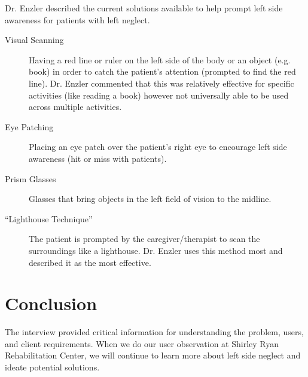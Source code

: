 Dr. Enzler described the current solutions available to help prompt left side
awareness for patients with left neglect. 
\begin{description}
\item[Visual Scanning] Having a red line or ruler on the left side of the body
  or an object (e.g. book) in order to catch the patient's attention (prompted
  to find the red line). Dr. Enzler commented that this was relatively
  effective for specific activities (like reading a book) however not
  universally able to be used across multiple activities.
\item[Eye Patching] Placing an eye patch over the patient’s right eye to
  encourage left side awareness (hit or miss with patients).
\item[Prism Glasses] Glasses that bring objects in the left field of vision to
  the midline. 
\item[``Lighthouse Technique''] The patient is prompted by the
  caregiver/therapist to scan the surroundings like a lighthouse. Dr. Enzler
  uses this method most and described it as the most effective.
\end{description}

\section{Conclusion}

The interview provided critical information for understanding the problem,
users, and client requirements. When we do our user observation at Shirley Ryan
Rehabilitation Center, we will continue to learn more about left side neglect
and ideate potential solutions.


